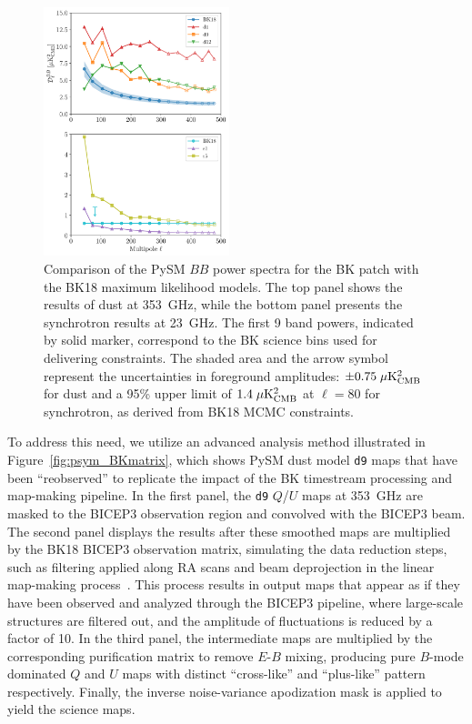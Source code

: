 \documentclass[twocolumn]{aastex631}
\begin{document}
\begin{figure}
    \centering
    \includegraphics[width=0.48\textwidth]{figures/BKfield_power.pdf}
    \caption{Comparison of the PySM $BB$ power spectra for the BK patch with the BK18 maximum likelihood models. The top panel shows the results of dust at 353~GHz, while the bottom panel presents the synchrotron results at 23~GHz. The first 9 band powers, indicated by solid marker, correspond to the BK science bins used for delivering constraints. The shaded area and the arrow symbol represent the uncertainties in foreground amplitudes: $\pm 0.75 \; \mu\rm{K^2_{CMB}}$ for dust and a 95\% upper limit of $1.4 \; \mu\rm{K^2_{CMB}}$ at $\ell = 80$ for synchrotron, as derived from BK18 MCMC constraints.}
    \label{fig:BKfield_power}
\end{figure}

To address this need, we utilize an advanced analysis method illustrated in Figure~\ref{fig:psym_BKmatrix}, which shows PySM dust model \texttt{d9} maps that have been ``reobserved'' to replicate the impact of the BK timestream processing and map-making pipeline. In the first panel, the \texttt{d9} $Q$/$U$ maps at 353~GHz are masked to the BICEP3 observation region and convolved with the BICEP3 beam. The second panel displays the results after these smoothed maps are multiplied by the BK18 BICEP3 observation matrix, simulating the data reduction steps, such as filtering applied along RA scans and beam deprojection in the linear map-making process~\cite{BICEP2Collaboration:2016}. This process results in output maps that appear as if they have been observed and analyzed through the BICEP3 pipeline, where large-scale structures are filtered out, and the amplitude of fluctuations is reduced by a factor of 10. In the third panel, the intermediate maps are multiplied by the corresponding purification matrix to remove $E$-$B$ mixing, producing pure $B$-mode dominated $Q$ and $U$ maps with distinct ``cross-like'' and ``plus-like'' pattern respectively. Finally, the inverse noise-variance apodization mask is applied to yield the science maps. 
\end{document}

